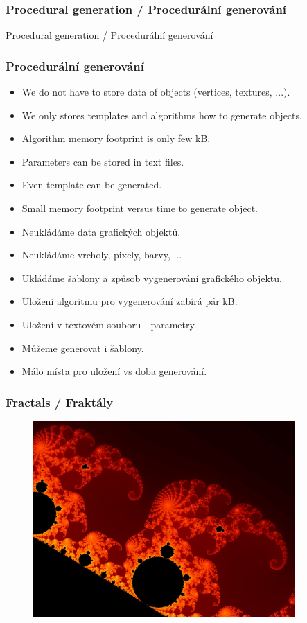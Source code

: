 \begin{frame}
  \frametitle{Procedural generation / Procedurální generování}
  \begin{center}
    \Huge {\color{white}Procedural generation / Procedurální generování}
  \end{center}
\end{frame}

\begin{frame}\frametitle{Procedurální generování}\scriptsize
\begin{itemize}
  \item We do not have to store data of objects (vertices, textures, ...).
  \item We only stores templates and algorithms how to generate objects.
  \item Algorithm memory footprint is only few kB.
  \item Parameters can be stored in text files.
  \item Even template can be generated.
  \item Small memory footprint versus time to generate object.
\end{itemize}
\begin{itemize}
  \item{Neukládáme data grafických objektů.}
  \item{Neukládáme vrcholy, pixely, barvy, ...}
  \item{Ukládáme šablony a způsob vygenerování grafického objektu.}
  \item{Uložení algoritmu pro vygenerování zabírá pár kB.}
  \item{Uložení v textovém souboru - parametry.}
  \item{Můžeme generovat i šablony.}
  \item{Málo místa pro uložení vs doba generování.}
\end{itemize}
\end{frame}

\begin{frame}\frametitle{Fractals / Fraktály}
	\begin{figure}[h]
		\includegraphics[width=10cm,keepaspectratio]{pics/procedural/fractal.jpg}
	\end{figure}
\end{frame}

